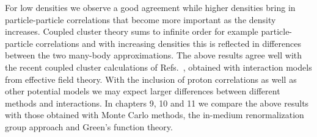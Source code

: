 \documentclass[thesis.tex]{subfiles}
\begin{document}
For low densities we observe a good agreement while higher densities
bring in particle-particle correlations that become more important as
the density increases. Coupled cluster theory sums to infinite order for
example particle-particle correlations and with increasing densities
this is reflected in differences between the two many-body
approximations.  The above results agree well with the recent coupled
cluster calculations of Refs.~\cite{baardsen2013,hagenmatter}, obtained with
interaction models from effective field theory.  With the inclusion of
proton correlations as well as other potential models we may expect 
larger differences between
different methods and interactions.  In chapters 9, 10 and 11 we compare the above results with 
those obtained with Monte Carlo methods, the in-medium renormalization group approach and Green's function theory.
\end{document}
